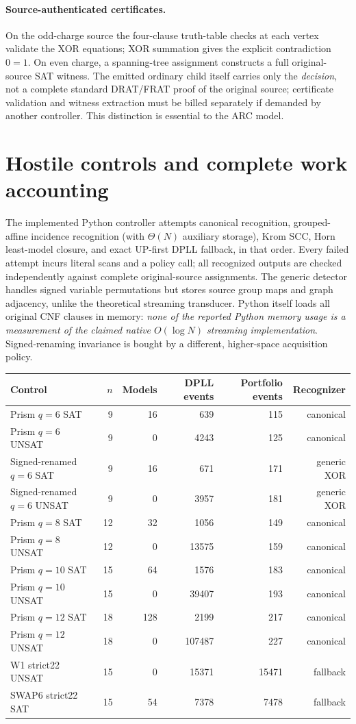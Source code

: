 \documentclass[11pt]{article}
\begin{document}
\paragraph{Source-authenticated certificates.} On the odd-charge source the four-clause truth-table checks at each vertex validate the XOR equations; XOR summation gives the explicit contradiction $0=1$. On even charge, a spanning-tree assignment constructs a full original-source SAT witness. The emitted ordinary child itself carries only the \emph{decision}, not a complete standard DRAT/FRAT proof of the original source; certificate validation and witness extraction must be billed separately if demanded by another controller. This distinction is essential to the ARC model.

\section{Hostile controls and complete work accounting}
The implemented Python controller attempts canonical recognition, grouped-affine incidence recognition (with $\Theta(N)$ auxiliary storage), Krom SCC, Horn least-model closure, and exact UP-first DPLL fallback, in that order. Every failed attempt incurs literal scans and a policy call; all recognized outputs are checked independently against complete original-source assignments. The generic detector handles signed variable permutations but stores source group maps and graph adjacency, unlike the theoretical streaming transducer. Python itself loads all original CNF clauses in memory: \emph{none of the reported Python memory usage is a measurement of the claimed native $O(\log N)$ streaming implementation}. Signed-renaming invariance is bought by a different, higher-space acquisition policy.

\begin{center}\begin{tabular}{lrrrrr}\toprule
Control & $n$ & Models & DPLL events & Portfolio events & Recognizer\\\midrule
Prism $q=6$ SAT & 9 &16&639&115& canonical\\
Prism $q=6$ UNSAT&9&0&4243&125& canonical\\
Signed-renamed $q=6$ SAT&9&16&671&171& generic XOR\\
Signed-renamed $q=6$ UNSAT&9&0&3957&181& generic XOR\\
Prism $q=8$ SAT&12&32&1056&149& canonical\\
Prism $q=8$ UNSAT&12&0&13575&159& canonical\\
Prism $q=10$ SAT&15&64&1576&183& canonical\\
Prism $q=10$ UNSAT&15&0&39407&193& canonical\\
Prism $q=12$ SAT&18&128&2199&217& canonical\\
Prism $q=12$ UNSAT&18&0&107487&227& canonical\\
W1 strict22 UNSAT&15&0&15371&15471& fallback\\
SWAP6 strict22 SAT&15&54&7378&7478& fallback\\
\bottomrule\end{tabular}\end{center}
\end{document}
